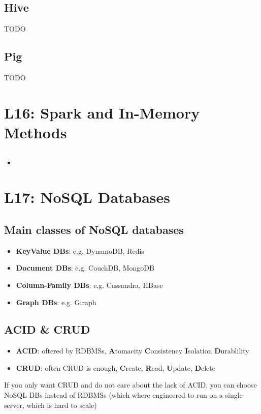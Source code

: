 \documentclass[a4paper]{article}
\begin{document}
\begin{multicols}{3}
\subsection{Hive}
TODO

\subsection{Pig}
TODO

\section{L16: Spark and In-Memory Methods}

\subsection{}
\begin{itemize}
    \item 
\end{itemize}

\section{L17: NoSQL Databases}

\subsection{Main classes of NoSQL databases}
\begin{itemize}
    \item \textbf{KeyValue DBs}: e.g. DynamoDB, Redis
    \item \textbf{Document DBs}: e.g. CouchDB, MongoDB
    \item \textbf{Column-Family DBs}: e.g. Cassandra, HBase
    \item \textbf{Graph DBs}: e.g. Giraph
\end{itemize}

\subsection{ACID \& CRUD}
\begin{itemize}
    \item \textbf{ACID}: oftered by RDBMSs, \textbf{A}tomacity \textbf{C}onsistency \textbf{I}solation \textbf{D}urablility
    \item \textbf{CRUD}: often CRUD is enough, \textbf{C}reate, \textbf{R}ead, \textbf{U}pdate, \textbf{D}elete
\end{itemize}
If you only want CRUD and do not care about the lack of ACID, you can choose NoSQL DBs instead of RDBMSs (which where engineered to run on a single server, which is hard to scale)


\end{multicols}
\end{document}
